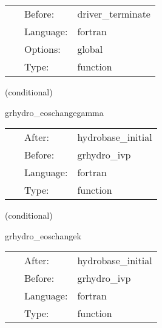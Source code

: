 \hspace{5mm}{\it deallocate weno coefficients } 


\hspace{5mm}

 \begin{tabular*}{160mm}{cll} 
~ & Before:  & driver\_terminate \\ 
~ & Language:  & fortran \\ 
~ & Options:  & global \\ 
~ & Type:  & function \\ 
\end{tabular*} 


\vspace{5mm}

   (conditional) 

\hspace{5mm} grhydro\_eoschangegamma 

\hspace{5mm}{\it reset the specific internal energy if the eos changes between id and evolution } 


\hspace{5mm}

 \begin{tabular*}{160mm}{cll} 
~ & After:  & hydrobase\_initial \\ 
~ & Before:  & grhydro\_ivp \\ 
~ & Language:  & fortran \\ 
~ & Type:  & function \\ 
\end{tabular*} 


\vspace{5mm}

   (conditional) 

\hspace{5mm} grhydro\_eoschangek 

\hspace{5mm}{\it reset the hydro variables if the eos (k) changes between id and evolution } 


\hspace{5mm}

 \begin{tabular*}{160mm}{cll} 
~ & After:  & hydrobase\_initial \\ 
~ & Before:  & grhydro\_ivp \\ 
~ & Language:  & fortran \\ 
~ & Type:  & function \\ 
\end{tabular*} 


